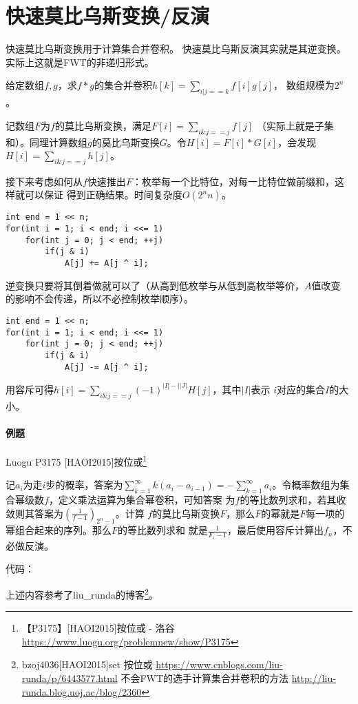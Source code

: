 \section{快速莫比乌斯变换/反演}
快速莫比乌斯变换用于计算集合并卷积。
快速莫比乌斯反演其实就是其逆变换。
实际上这就是FWT的非递归形式。

给定数组$f,g$，求$f*g$的集合并卷积$\displaystyle h[k]=\sum_{i|j==k}{f[i]g[j]}$，
数组规模为$2^n$。

记数组$F$为$f$的莫比乌斯变换，满足$\displaystyle F[i]=\sum_{i\&j==j}{f[j]}$
（实际上就是子集和）。同理计算数组$g$的莫比乌斯变换$G$。令$H[i]=F[i]*G[i]$，会发现
$\displaystyle H[i]=\sum_{i\&j==j}{h[j]}$。

接下来考虑如何从$f$快速推出$F$：枚举每一个比特位，对每一比特位做前缀和，这样就可以保证
得到正确结果。时间复杂度$O(2^nn)$。
\begin{lstlisting}
int end = 1 << n;
for(int i = 1; i < end; i <<= 1)
    for(int j = 0; j < end; ++j)
        if(j & i)
            A[j] += A[j ^ i];
\end{lstlisting}

逆变换只要将其倒着做就可以了（从高到低枚举与从低到高枚举等价，$A$值改变
的影响不会传递，所以不必控制枚举顺序）。
\begin{lstlisting}
int end = 1 << n;
for(int i = 1; i < end; i <<= 1)
    for(int j = 0; j < end; ++j)
        if(j & i)
            A[j] -= A[j ^ i];
\end{lstlisting}

用容斥可得$\displaystyle h[i]=\sum_{i\&j==j}{(-1)^{|I|-||J|}H[j]}$，其中$|I|$表示
$i$对应的集合$I$的大小。

\paragraph{例题}
Luogu P3175 [HAOI2015]按位或\footnote{
    【P3175】[HAOI2015]按位或 - 洛谷
    \url{https://www.luogu.org/problemnew/show/P3175}
}

记$a_i$为走$i$步的概率，答案为$\displaystyle \sum_{k=1}^\infty{k(a_i-a_{i-1})}=
-\sum_{k=1}^\infty a_i$。令概率数组为集合幂级数$f$，定义乘法运算为集合幂卷积，可知答案
为$f$的等比数列求和，若其收敛则其答案为$\left(\frac{1}{f-1}\right)_{2^n-1}$。计算
$f$的莫比乌斯变换$F$，那么$F$的幂就是$F$每一项的幂组合起来的序列。那么$F$的等比数列求和
就是${\frac{1}{F_i-1}}$，最后使用容斥计算出$f_n$，不必做反演。

代码：


上述内容参考了liu\_runda的博客\footnote{
    bzoj4036[HAOI2015]set 按位或
    \url{https://www.cnblogs.com/liu-runda/p/6443577.html}
    不会FWT的选手计算集合并卷积的方法
    \url{http://liu-runda.blog.uoj.ac/blog/2360}
}。
